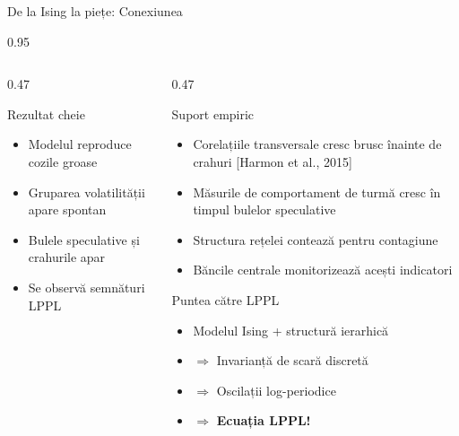 \documentclass[9pt, aspectratio=169, t]{beamer}
\begin{document}
\begin{frame}{De la Ising la piețe: Conexiunea}
\begin{cminipage}{0.95\textwidth}
{\begin{columns}[T]
\begin{column}{0.47\textwidth}
            \begin{alertblock}{Rezultat cheie}
                \begin{itemize}\setlength{\itemsep}{0pt}
                    \item Modelul reproduce cozile groase
                    \item Gruparea volatilității apare spontan
                    \item Bulele speculative și crahurile apar
                    \item Se observă semnături LPPL
                \end{itemize}
            \end{alertblock}
        \end{column}
        \begin{column}{0.47\textwidth}
            \begin{exampleblock}{Suport empiric}
                \begin{itemize}\setlength{\itemsep}{0pt}
                    \item Corelațiile transversale cresc brusc înainte de crahuri [Harmon et al., 2015]
                    \item Măsurile de comportament de turmă cresc în timpul bulelor speculative
                    \item Structura rețelei contează pentru contagiune
                    \item Băncile centrale monitorizează acești indicatori
                \end{itemize}
            \end{exampleblock}

            \begin{block}{Puntea către LPPL}
                \begin{itemize}\setlength{\itemsep}{0pt}
                    \item Modelul Ising + structură ierarhică
                    \item $\Rightarrow$ Invarianță de scară discretă
                    \item $\Rightarrow$ Oscilații log-periodice
                    \item $\Rightarrow$ \textbf{Ecuația LPPL!}
                \end{itemize}
            \end{block}
        \end{column}
    \end{columns}
    }
    \end{cminipage}
\end{frame}
\end{document}
